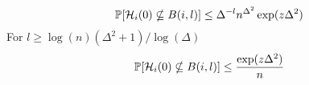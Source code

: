 \begin{corollary}
\label{cor:prob update function time 0 in B(i, l)}
	\begin{equation}
		\mathbb{P}[\mathcal{H}_i(0) \nsubseteq B(i,l)] \leq \Delta^{-l} n^{\Delta^2} \exp(z \Delta^2)
	\end{equation}
	For $l \geq \log(n)(\Delta^2 + 1)/\log(\Delta)$
	\begin{equation}
			\mathbb{P}[\mathcal{H}_i(0) \nsubseteq B(i,l)] \leq \frac{\exp(z \Delta^2)}{n}
	\end{equation}
\end{corollary}


